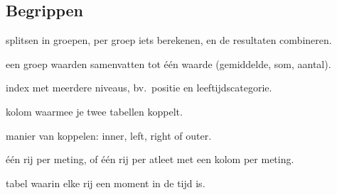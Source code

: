 \documentclass[11pt,a4paper]{article}
\begin{document}
\subsection*{Begrippen}

\begin{description}[leftmargin=3.2cm, labelwidth=3.0cm, font=\normalfont\bfseries]
  \item[groupby] splitsen in groepen, per groep iets berekenen, en de resultaten combineren.
  \item[aggregatie] een groep waarden samenvatten tot één waarde (gemiddelde, som, aantal).
  \item[MultiIndex] index met meerdere niveaus, bv.\ positie en leeftijdscategorie.
  \item[sleutel] kolom waarmee je twee tabellen koppelt.
  \item[join] manier van koppelen: inner, left, right of outer.
  \item[lang / breed] één rij per meting, of één rij per atleet met een kolom per meting.
  \item[tijdreeks] tabel waarin elke rij een moment in de tijd is.
\end{description}
\end{document}
